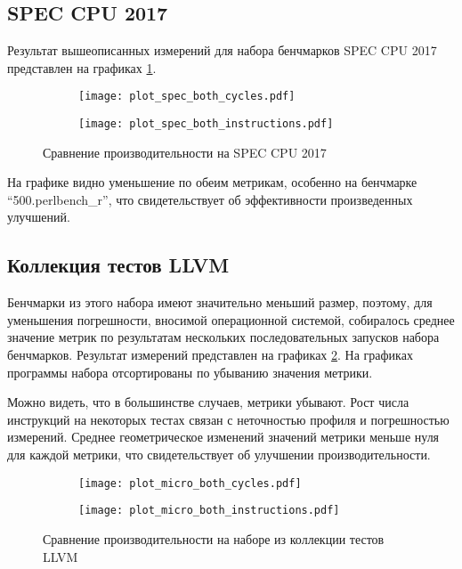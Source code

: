 \subsection{SPEC CPU\texorpdfstring{\textsuperscript{\tiny\textregistered}}{} 2017}

Результат вышеописанных измерений для набора бенчмарков SPEC CPU\textsuperscript{\tiny\textregistered} 2017 представлен на графиках \ref{fig:plot_spec_both}.

\begin{figure}
    \centering
    \begin{subfigure}{0.4\textwidth}
        \centering
        \texttt{[image: plot\_spec\_both\_cycles.pdf]}
    \end{subfigure}
    \begin{subfigure}{0.4\textwidth}
        \centering
        \texttt{[image: plot\_spec\_both\_instructions.pdf]}
    \end{subfigure}
    \caption{Сравнение производительности на SPEC CPU\textsuperscript{\tiny\textregistered} 2017}
    \label{fig:plot_spec_both}
\end{figure}

На графике видно уменьшение по обеим метрикам, особенно на бенчмарке \enquote{500.perlbench\_r}, что свидетельствует об эффективности произведенных улучшений.

\subsection{Коллекция тестов LLVM}

Бенчмарки из этого набора имеют значительно меньший размер, поэтому, для уменьшения погрешности, вносимой операционной системой, собиралось среднее значение метрик по результатам нескольких последовательных запусков набора бенчмарков.
Результат измерений представлен на графиках \ref{fig:plot_micro_both}.
На графиках программы набора отсортированы по убыванию значения метрики.

Можно видеть, что в большинстве случаев, метрики убывают.
Рост числа инструкций на некоторых тестах связан с неточностью профиля и погрешностью измерений.
Среднее геометрическое изменений значений метрики меньше нуля для каждой метрики, что свидетельствует об улучшении производительности.

\begin{figure}
    \centering
    \begin{subfigure}{0.4\textwidth}
        \centering
        \texttt{[image: plot\_micro\_both\_cycles.pdf]}
    \end{subfigure}
    \begin{subfigure}{0.4\textwidth}
        \centering
        \texttt{[image: plot\_micro\_both\_instructions.pdf]}
    \end{subfigure}
    \caption{Сравнение производительности на наборе из коллекции тестов LLVM}
    \label{fig:plot_micro_both}
\end{figure}

\newpage
